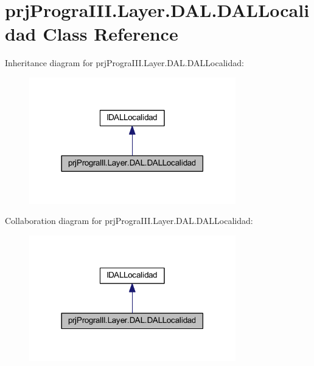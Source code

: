 \hypertarget{classprj_progra_i_i_i_1_1_layer_1_1_d_a_l_1_1_d_a_l_localidad}{}\section{prj\+Progra\+I\+I\+I.\+Layer.\+D\+A\+L.\+D\+A\+L\+Localidad Class Reference}
\label{classprj_progra_i_i_i_1_1_layer_1_1_d_a_l_1_1_d_a_l_localidad}


Inheritance diagram for prj\+Progra\+I\+I\+I.\+Layer.\+D\+A\+L.\+D\+A\+L\+Localidad\+:
\nopagebreak
\begin{figure}[H]
\begin{center}
\leavevmode
\includegraphics[width=254pt]{classprj_progra_i_i_i_1_1_layer_1_1_d_a_l_1_1_d_a_l_localidad__inherit__graph}
\end{center}
\end{figure}


Collaboration diagram for prj\+Progra\+I\+I\+I.\+Layer.\+D\+A\+L.\+D\+A\+L\+Localidad\+:
\nopagebreak
\begin{figure}[H]
\begin{center}
\leavevmode
\includegraphics[width=254pt]{classprj_progra_i_i_i_1_1_layer_1_1_d_a_l_1_1_d_a_l_localidad__coll__graph}
\end{center}
\end{figure}
